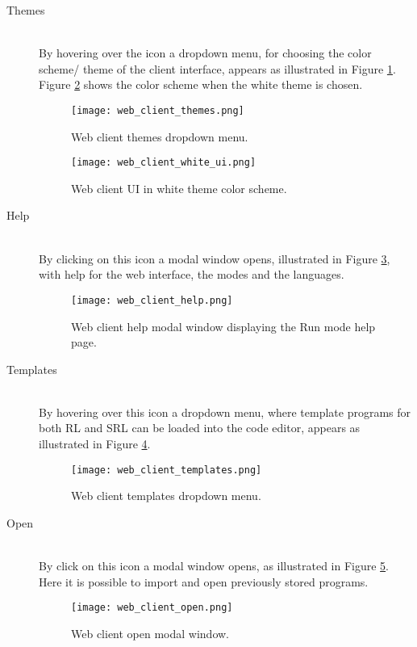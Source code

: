 \begin{description}

  \item[ Themes]~\\
    By hovering over the icon a dropdown menu, for choosing the color scheme/ theme of the client interface, appears as illustrated in Figure \ref{fig:web_client_themes}.
    Figure \ref{fig:web_client_white_ui} shows the color scheme when the white theme is chosen.
    \begin{figure}
      \texttt{[image: web\_client\_themes.png]}
      \caption{Web client themes dropdown menu.}
      \label{fig:web_client_themes}
    \end{figure}
    \begin{figure}
      \texttt{[image: web\_client\_white\_ui.png]}
      \caption{Web client UI in white theme color scheme.}
      \label{fig:web_client_white_ui}
    \end{figure}

  \item[ Help]~\\
    By clicking on this icon a modal window opens, illustrated in Figure \ref{fig:web_client_help}, with help for the web interface, the modes and the languages.
    \begin{figure}
      \texttt{[image: web\_client\_help.png]}
      \caption{Web client help modal window displaying the Run mode help page.}
      \label{fig:web_client_help}
    \end{figure}

  \item[ Templates]~\\
    By hovering over this icon a dropdown menu, where template programs for both RL and SRL can be loaded into the code editor, appears as illustrated in Figure \ref{fig:web_client_templates}.
    \begin{figure}
      \texttt{[image: web\_client\_templates.png]}
      \caption{Web client templates dropdown menu.}
      \label{fig:web_client_templates}
    \end{figure}

  \item[ Open]~\\
    By click on this icon a modal window opens, as illustrated in Figure \ref{fig:web_client_open}. Here it is possible to import and open previously stored programs.
    \begin{figure}
      \texttt{[image: web\_client\_open.png]}
      \caption{Web client open modal window.}
      \label{fig:web_client_open}
    \end{figure}


\end{description}
